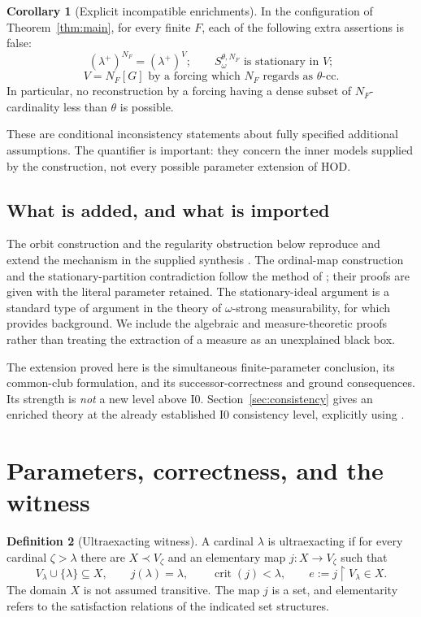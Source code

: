 \documentclass[11pt,letterpaper]{article}
\theoremstyle{definition}
\newtheorem{definition}{Definition}[section]
\newtheorem{corollary}[definition]{Corollary}
\numberwithin{equation}{section}
\newcommand{\HOD}{\mathrm{HOD}}
\newcommand{\crit}{\operatorname{crit}}
\newcommand{\restr}{\mathbin{\upharpoonright}}
\newcommand{\Izero}{\mathrm{I0}}
\begin{document}
\begin{corollary}[Explicit incompatible enrichments]\label{cor:incompatible}
In the configuration of Theorem~\ref{thm:main}, for every finite $F$, each of the following extra assertions is false:
\[
(\lambda^+)^{N_F}=(\lambda^+)^V;
\qquad
S_\omega^{\theta,N_F}\text{ is stationary in }V;
\]
\[
V=N_F[G]\text{ by a forcing which }N_F\text{ regards as }\theta\text{-cc}.
\]
In particular, no reconstruction by a forcing having a dense subset of $N_F$-cardinality less than $\theta$ is possible.
\end{corollary}

These are conditional inconsistency statements about fully specified additional assumptions. The quantifier is important: they concern the inner models supplied by the construction, not every possible parameter extension of $\HOD$.

\subsection{What is added, and what is imported}

The orbit construction and the regularity obstruction below reproduce and extend the mechanism in the supplied synthesis \cite[Sections~8 and~12]{synthesis}. The ordinal-map construction and the stationary-partition contradiction follow the method of \cite[Lemmas~3.7--3.9 and Theorem~3.14]{abl}; their proofs are given with the literal parameter retained. The stationary-ideal argument is a standard type of argument in the theory of $\omega$-strong measurability, for which \cite{benhayut} provides background. We include the algebraic and measure-theoretic proofs rather than treating the extraction of a measure as an unexplained black box.

The extension proved here is the simultaneous finite-parameter conclusion, its common-club formulation, and its successor-correctness and ground consequences. Its strength is \emph{not} a new level above $\Izero$. Section~\ref{sec:consistency} gives an enriched theory at the already established $\Izero$ consistency level, explicitly using \cite[Proposition~3.9, Corollary~3.10, and Theorem~4.5]{abgl}.

\section{Parameters, correctness, and the witness}\label{sec:setup}

\begin{definition}[Ultraexacting witness]\label{def:witness}
A cardinal $\lambda$ is ultraexacting if for every cardinal $\zeta>\lambda$ there are $X\prec V_\zeta$ and an elementary map $j:X\to V_\zeta$ such that
\[
V_\lambda\cup\{\lambda\}\subseteq X,
\qquad j(\lambda)=\lambda,
\qquad\crit(j)<\lambda,
\qquad e:=j\restr V_\lambda\in X.
\]
The domain $X$ is not assumed transitive. The map $j$ is a set, and elementarity refers to the satisfaction relations of the indicated set structures.
\end{definition}
\end{document}
